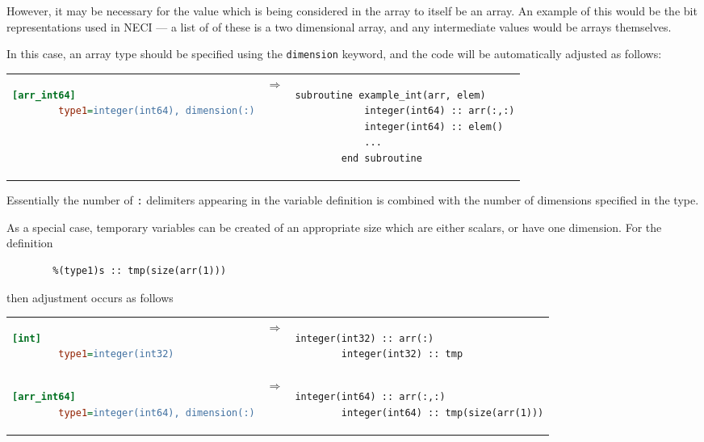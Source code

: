 \documentclass[a4paper,notitlepage,dvipsnames]{scrreprt}
\let\code\lstinline
\begin{document}
{{	However, it may be necessary for the value which is being considered in
	the array to itself be an array. An example of this would be the bit
	representations used in NECI --- a list of of these is a two dimensional
	array, and any intermediate values would be arrays themselves.

	In this case, an array type should be specified using the \code{dimension}
	keyword, and the code will be automatically adjusted as follows:

	\begin{tabular}{lcl}
	\begin{lstlisting}[language=ini,gobble=8]
		[arr_int64]
		type1=integer(int64), dimension(:)
	\end{lstlisting}

	& $\Longrightarrow$ &

	\begin{lstlisting}[gobble=8]
		subroutine example_int(arr, elem)
			integer(int64) :: arr(:,:)
			integer(int64) :: elem()
			...
		end subroutine
	\end{lstlisting}
	\end{tabular}

	Essentially the number of \code{:} delimiters appearing in the variable
	definition is combined with the number of dimensions specified in the type.

	As a special case, temporary variables can be created of an appropriate
	size which are either scalars, or have one dimension. For the definition
	\begin{lstlisting}[gobble=4]
		%(type1)s :: arr(:)
		%(type1)s :: tmp(size(arr(1)))
	\end{lstlisting}
	then adjustment occurs as follows

	\begin{tabular}{lcl}
	\begin{lstlisting}[language=ini,gobble=8]
		[int]
		type1=integer(int32)
	\end{lstlisting}
	& $\Longrightarrow$ &
	\begin{lstlisting}[gobble=8]
		integer(int32) :: arr(:)
		integer(int32) :: tmp
	\end{lstlisting} \\[1.5em]

	\begin{lstlisting}[language=ini,gobble=8]
		[arr_int64]
		type1=integer(int64), dimension(:)
	\end{lstlisting}
	& $\Longrightarrow$ &
	\begin{lstlisting}[gobble=8]
		integer(int64) :: arr(:,:)
		integer(int64) :: tmp(size(arr(1)))
	\end{lstlisting}
	\end{tabular}

}}
\end{document}
